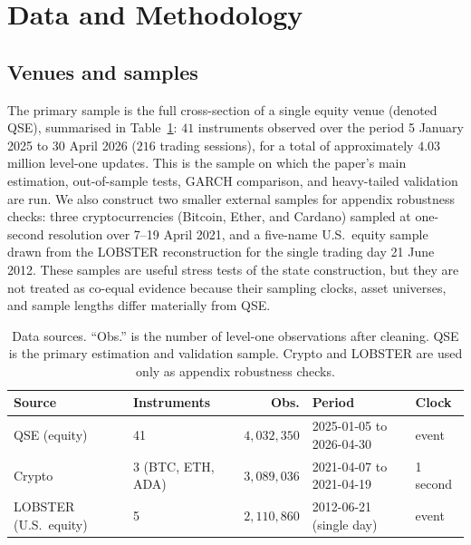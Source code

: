 \documentclass[11pt]{article}
\theoremstyle{plain}
\theoremstyle{definition}
\begin{document}
\section{Data and Methodology}
\label{sec:data}

\subsection{Venues and samples}
\label{sub:venues}

The primary sample is the full cross-section of a single equity venue (denoted QSE),
summarised in Table~\ref{tab:venues}: $41$ instruments observed over the period
5 January 2025 to 30 April 2026 ($216$ trading sessions), for a total of
approximately $4.03$ million level-one updates. This is the sample on which the paper's main estimation, out-of-sample
tests, GARCH comparison, and heavy-tailed validation are run. We also construct two
smaller external samples for appendix robustness checks: three cryptocurrencies
(Bitcoin, Ether, and Cardano) sampled at one-second resolution over 7--19 April
2021, and a five-name U.S.\ equity sample drawn from the LOBSTER reconstruction for
the single trading day 21 June 2012. These samples are useful stress tests of the
state construction, but they are not treated as co-equal evidence because their
sampling clocks, asset universes, and sample lengths differ materially from QSE.

\begin{table}[!htbp]
\centering
\caption{Data sources. ``Obs.'' is the number of level-one observations after
cleaning. QSE is the primary estimation and validation sample. Crypto and LOBSTER
are used only as appendix robustness checks.}
\label{tab:venues}
\small
\begin{tabular}{@{}llrll@{}}
\toprule
Source & Instruments & Obs. & Period & Clock \\
\midrule
QSE (equity) & 41 & $4{,}032{,}350$ & 2025-01-05 to 2026-04-30 & event \\
Crypto & 3 (BTC, ETH, ADA) & $3{,}089{,}036$ & 2021-04-07 to 2021-04-19 & 1 second \\
LOBSTER (U.S.\ equity) & 5 & $2{,}110{,}860$ & 2012-06-21 (single day) & event \\
\bottomrule
\end{tabular}
\end{table}
\end{document}
